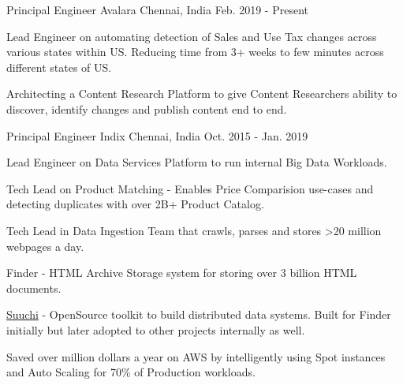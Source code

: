 

\begin{cventries}

  \cventry
    {Principal Engineer} %
    {Avalara} %
    {Chennai, India} %
    {Feb. 2019 - Present} %
    {
      \begin{cvitems} %
        \item {Lead Engineer on automating detection of Sales and Use Tax changes across various states within US. Reducing time from 3+ weeks to few minutes across different states of US. }
        \item {Architecting a Content Research Platform to give Content Researchers ability to discover, identify changes and publish content end to end. }
      \end{cvitems}
    }

  \cventry
    {Principal Engineer} %
    {Indix} %
    {Chennai, India} %
    {Oct. 2015 - Jan. 2019} %
    {
      \begin{cvitems} %
        \item {Lead Engineer on Data Services Platform to run internal Big Data Workloads. }
        \item {Tech Lead on Product Matching - Enables Price Comparision use-cases and detecting duplicates with over 2B+ Product Catalog. }
        \item {Tech Lead in Data Ingestion Team that crawls, parses and stores >20 million webpages a day. }
        \item {Finder - HTML Archive Storage system for storing over 3 billion HTML documents.}
        \item {\href{https://github.com/ashwanthkumar/suuchi}{Suuchi} - OpenSource toolkit to build distributed data systems. Built for Finder initially but later adopted to other projects internally as well. }
        \item {Saved over million dollars a year on AWS by intelligently using Spot instances and Auto Scaling for 70\% of Production workloads. }
      \end{cvitems}
    }


\end{cventries}

